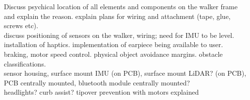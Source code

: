 \noindent Discuss psychical location of all elements and components on the walker frame and explain the reason. explain plans for wiring and attachment (tape, glue, screws etc).\\

\noindent discuss positioning of sensors on the walker, wiring; need for IMU to be level. installation of haptics. implementation of earpiece being available to user. braking, motor speed control. physical object avoidance margins. obstacle classifications.\\

\noindent sensor housing, surface mount IMU (on PCB), surface mount LiDAR? (on PCB), PCB centrally mounted, bluetooth module centrally mounted?\\

\noindent headlights? curb assist? tipover prevention with motors explained\\